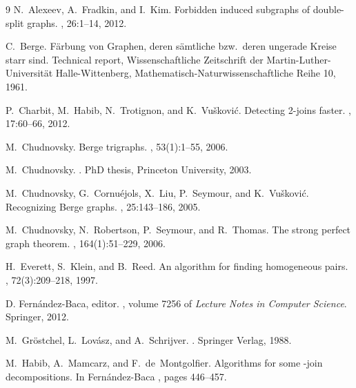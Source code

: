 \documentclass[11 pt] {article}
\begin{document}
\begin {thebibliography}{9}
N.~Alexeev, A.~Fradkin, and I.~Kim.
\newblock Forbidden induced subgraphs of double-split graphs.
, 26:1--14, 2012.


C.~Berge.
\newblock F{\"a}rbung von {G}raphen, deren s{\"a}mtliche bzw.~deren ungerade
  {K}reise starr sind.
\newblock Technical report, Wissenschaftliche Zeitschrift der
  Martin-Luther-Universit{\"a}t Halle-Wittenberg,
  Mathematisch-Naturwissenschaftliche Reihe 10, 1961.

P.~Charbit, M.~Habib, N.~Trotignon, and K.~Vu{\v s}kovi{\'c}.
\newblock Detecting 2-joins faster.
, 17:60--66, 2012.


M.~Chudnovsky.
\newblock Berge trigraphs.
, 53(1):1--55, 2006.


 M.~Chudnovsky.
.
\newblock PhD thesis, Princeton University, 2003.

M.~Chudnovsky, G.~Cornu{\'e}jols, X.~Liu, P.~Seymour, and K.~Vu{\v s}kovi{\'c}.
\newblock Recognizing {B}erge graphs.
, 25:143--186, 2005.
 
 M.~Chudnovsky, N.~Robertson, P.~Seymour, and R.~Thomas.
\newblock The strong perfect graph theorem.
, 164(1):51--229, 2006.

H.~Everett, S.~Klein, and B.~Reed.
\newblock An algorithm for finding homogeneous pairs.
, 72(3):209--218, 1997.

D. Fern{\'a}ndez-Baca, editor.
, volume 7256 of
  {\em Lecture Notes in Computer Science}. Springer, 2012.


M.~Gr{\"o}stchel, L.~Lov{\'a}sz, and A.~Schrijver.
.
\newblock Springer Verlag, 1988.


M.~Habib, A.~Mamcarz, and F.~de~Montgolfier.
\newblock Algorithms for some -join decompositions.
\newblock In Fern{\'a}ndez-Baca \cite{DBLP:conf/latin/2012}, pages 446--457.



\end{thebibliography}
\end{document}
